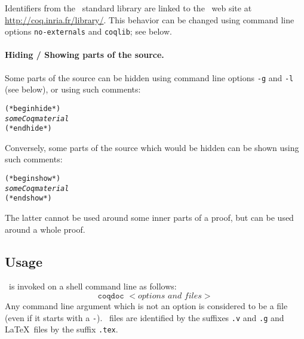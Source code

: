 Identifiers from the \Coq\ standard library are linked to the \Coq\
web site at \url{http://coq.inria.fr/library/}. This behavior can be
changed using command line options \texttt{\mm{}no-externals} and
\texttt{\mm{}coqlib}; see below.


\paragraph{Hiding / Showing parts of the source.}
Some parts of the source can be hidden using command line options
\texttt{-g} and \texttt{-l} (see below), or using such comments:
\begin{alltt}
(* begin hide *)
\emph{some Coq material}
(* end hide *)
\end{alltt}
Conversely, some parts of the source which would be hidden can be
shown using such comments: 
\begin{alltt}
(* begin show *)
\emph{some Coq material}
(* end show *)
\end{alltt}
The latter cannot be used around some inner parts of a proof, but can
be used around a whole proof.



\subsection{Usage}

\coqdoc\ is invoked on a shell command line as follows:
\begin{displaymath}
  \texttt{coqdoc }<\textit{options and files}>
\end{displaymath}
Any command line argument which is not an option is considered to be a
file (even if it starts with a \verb!-!). \Coq\ files are identified
by the suffixes \verb!.v! and \verb!.g! and \LaTeX\ files by the
suffix \verb!.tex!. 

